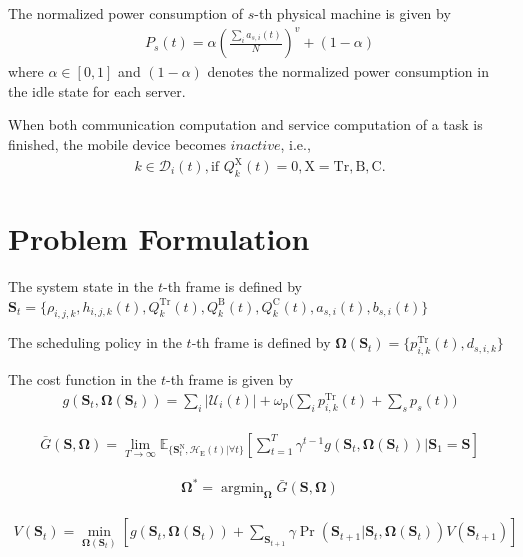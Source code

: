 \documentclass[journal, 12pt, onecolumn, draftclsnofoot]{IEEEtran}
\begin{document}
The normalized power consumption of $s$-th physical machine is given by
\begin{align}
	P_{s}(t)= \alpha\left(\frac{\sum_{i}a_{s,i}(t)}{N}\right)^{v}+(1-\alpha)
\end{align}
where $\alpha\in[0,1]$ and $(1-\alpha)$ denotes the normalized power consumption in the idle state for each server.

When both communication computation and service computation of a task is finished, the mobile device becomes $\textit{inactive}$, i.e.,
\begin{align}
	k\in\mathcal{D}_{i}(t),\text{if }Q_{k}^{\mathrm{X}}(t)=0,\mathrm{X}=\mathrm{Tr},\mathrm{B},\mathrm{C}.
\end{align}

\section{Problem Formulation}
The system state in the $t$-th frame is defined by \\
$\mathbf{S}_{t}=\{\rho_{i,j,k},h_{i,j,k}(t),Q_{k}^{\mathrm{Tr}}(t),Q_{k}^{\mathrm{B}}(t),Q_{k}^{\mathrm{C}}(t),a_{s,i}(t),b_{s,i}(t)\}$

The scheduling policy in the $t$-th frame is defined by $\mathbf{\Omega}(\mathbf{S}_{t})=\{p_{i,k}^{\mathrm{Tr}}(t),d_{s,i,k}\}$

The cost function in the $t$-th frame is given by
\begin{align}
	g(\mathbf{S}_{t},\mathbf{\Omega}(\mathbf{S}_{t}))=\sum_{i}|\mathcal{U}_{i}(t)|+\omega_{\mathrm{p}}\bigg(\sum_{i}p_{i,k}^{\mathrm{Tr}}(t)+\sum_{s}p_{s}(t)\bigg)
\end{align}

\begin{align}
	\bar{G}(\mathbf{S},\mathbf{\Omega})=\lim_{T\to\infty}\mathbb{E}_{\{\mathbf{S}_{t}^{\mathrm{N}},\mathcal{H}_{\mathrm{E}}(t)|\forall t\}}\left[\sum_{t=1}^{T}\gamma^{t-1}g(\mathbf{S}_{t},\mathbf{\Omega}(\mathbf{S}_{t}))|\mathbf{S}_{1}=\mathbf{S}\right]
\end{align}

\begin{align}
	\mathbf{\Omega}^{*}=\mathop{\arg\min}_{\mathbf{\Omega}}\bar{G}(\mathbf{S},\mathbf{\Omega})
\end{align}

\begin{align}
	V(\mathbf{S}_{t})=\min_{\mathbf{\Omega}(\mathbf{S}_{t})}\left[g(\mathbf{S}_{t},\mathbf{\Omega}(\mathbf{S}_{t}))+\sum_{\mathbf{S}_{t+1}}\gamma\Pr(\mathbf{S}_{t+1}|\mathbf{S}_{t},\mathbf{\Omega}(\mathbf{S}_{t}))V(\mathbf{S}_{t+1})\right]
\end{align}


\appendices


\end{document}
